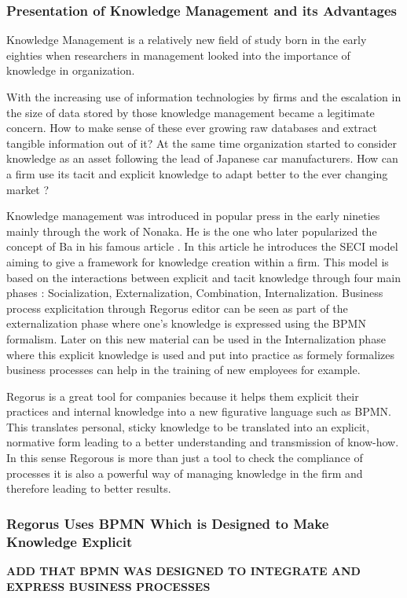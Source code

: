 \documentclass[10pt]{report}
\begin{document}
\subsubsection{Presentation of Knowledge Management and its Advantages}

Knowledge Management is a relatively new field of study born in the early eighties when researchers in management looked into the importance of knowledge in organization.\autocite{Wiig19971}

With the increasing use of information technologies by firms and the escalation in the size of data stored by those knowledge management became a legitimate concern. How to make sense of these ever growing raw databases and extract tangible information out of it? At the same time organization started to consider knowledge as an asset following the lead of Japanese car manufacturers.\autocite{Koenig08} How can a firm use its tacit and explicit knowledge to adapt better to the ever changing market ?

Knowledge management was introduced in popular press in the early nineties mainly through the work of Nonaka. \autocite{nonaka1991knowledge} He is the one who later popularized the concept of Ba in his famous article \autocite{Nonaka_Konno_1998}. In this article he introduces the SECI model aiming to give a framework for knowledge creation within a firm. This model is based on the interactions between explicit and tacit knowledge through four main phases : Socialization, Externalization, Combination, Internalization. Business process explicitation through Regorus editor can be seen as part of the externalization phase where one's knowledge is expressed using the BPMN formalism. Later on this new material can be used in the Internalization phase where this explicit knowledge is used and put into practice as formely formalizes business processes can help in the training of new employees for example.

Regorus is a great tool for companies because it helps them explicit their practices and internal knowledge into a new figurative language such as BPMN. This translates personal, sticky knowledge to be translated into an explicit, normative form leading to a better understanding and transmission of know-how. In this sense Regorous is more than just a tool to check the compliance of processes it is also a powerful way of managing knowledge in the firm and therefore leading to better results.

\subsubsection{Regorus Uses BPMN Which is Designed to Make Knowledge Explicit}
\textbf{ADD THAT BPMN WAS DESIGNED TO INTEGRATE AND EXPRESS BUSINESS PROCESSES}
\end{document}

